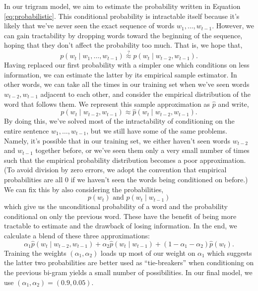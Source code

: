 \documentclass[12pt]{article}
\begin{document}
In our trigram model, we aim to estimate the probability written in Equation
\ref{eq:probabilistic}. This conditional probability is intractable itself
because it's likely that we've never seen the exact sequence of words $w_1,
\ldots, w_{t-1}$. However, we can gain tractability by dropping words toward the
beginning of the sequence, hoping that they don't affect the probability too
much. That is, we hope that,
\[ p(w_t \mid w_1, \ldots, w_{t-1}) \stackrel{?}{\approx} p(w_t \mid w_{t-2},
w_{t-1}).\]
Having replaced our first probability with a simpler one which conditions on
less information, we can estimate the latter by its empirical sample estimator.
In other words, we can take all the times in our training set when we've seen
words $w_{t-2}, w_{t-1}$ adjacent to each other, and consider the empirical
distribution of the word that follows them. We represent this sample
approximation as $\hat{p}$ and write,
\[ p (w_t \mid w_{t-2}, w_{t-1}) \approx \hat{p} (w_t \mid w_{t-2}, w_{t-1}).\]
By doing this, we've solved most of the intractability of conditioning on the
entire sentence $w_1, \ldots, w_{t-1}$, but we still have some of the same
problems. Namely, it's possible that in our training set, we either haven't seen
words $w_{t-2}$ and $w_{t-1}$ together before, or we've seen them only a very
small number of times such that the empirical probability distribution becomes a
poor approximation. (To avoid division by zero errors, we adopt the convention
that empirical probabilities are all 0 if we haven't seen the words being
conditioned on before.) We can fix this by also considering the probabilities,
\[ p(w_t) \text{ and } p(w_t \mid w_{t-1})\]
which give us the unconditional probability of a word and the probability
conditional on only the previous word. These have the benefit of being more
tractable to estimate and the drawback of losing information. In the end, we
calculate a blend of these three approximations:
\[ \alpha_1 \hat{p}(w_t \mid w_{t-2}, w_{t-1}) + \alpha_2
\hat{p}(w_t \mid w_{t-1}) + (1-\alpha_1-\alpha_2)\hat{p}(w_t).\]
Training the weights $(\alpha_1, \alpha_2)$ loads up most of our weight on
$\alpha_1$ which suggests the latter two probabilities are better used as
``tie-breakers'' when conditioning on the previous bi-gram yields a small number
of possibilities. In our final model, we use $(\alpha_1, \alpha_2) = (0.9,
0.05)$.
\end{document}
